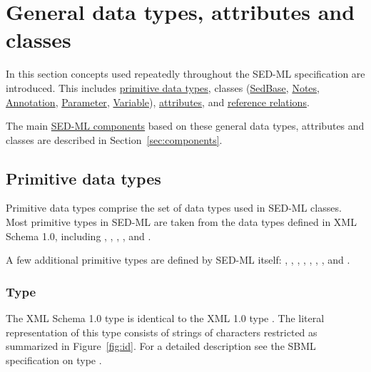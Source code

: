 \pagebreak

\section{General data types, attributes and classes}
In this section concepts used repeatedly throughout the SED-ML specification are introduced. This includes  \hyperref[sec:dataTypes]{primitive data types}, classes (\hyperref[class:sedBase]{SedBase}, \hyperref[class:notes]{Notes}, \hyperref[class:notes]{Annotation}, \hyperref[class:parameter]{Parameter}, \hyperref[class:variable]{Variable}), \hyperref[sec:generalAttributes]{attributes}, and \hyperref[sec:reference]{reference relations}.

The main \hyperref[sec:components]{SED-ML components} based on these general data types, attributes and classes are described in Section~\ref{sec:components}.

\subsection{Primitive data types}
\label{sec:dataTypes}
Primitive data types comprise the set of data types used in SED-ML classes. Most primitive types in SED-ML are taken from the data types defined in XML Schema 1.0, including , , , ,  and . 

A few additional primitive types are defined by SED-ML itself: \hyperref[type:id]{}, \hyperref[type:sid]{}, \hyperref[type:sidref]{}, \hyperref[type:xpath]{}, \hyperref[type:mathml]{}, \hyperref[type:anyURI]{}, \hyperref[type:numlsid]{}, and \hyperref[type:numlsidref]{}.

\subsubsection[\element{ID}]{Type }
\label{type:id}
The XML Schema 1.0 type  is identical to the XML 1.0 type . The literal representation of this type consists of strings of characters restricted as summarized in Figure~\vref{fig:id}. For a detailed description see the SBML specification on type  \citep{HBH+10}.

